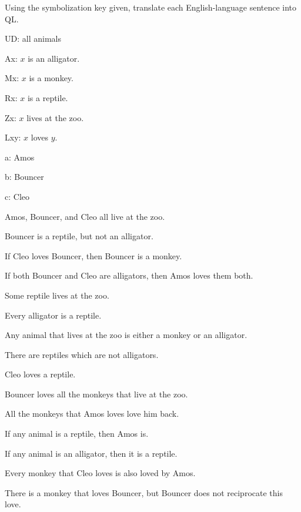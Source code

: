 \solutions
\problempart
\label{pr.QLalligators}
Using the symbolization key given, translate each English-language sentence into QL.
\begin{ekey}
\item[UD:] all animals
\item[Ax:] $x$ is an alligator.
\item[Mx:] $x$ is a monkey.
\item[Rx:] $x$ is a reptile.
\item[Zx:] $x$ lives at the zoo.
\item[Lxy:] $x$ loves $y$.
\item[a:] Amos
\item[b:] Bouncer
\item[c:] Cleo
\end{ekey}
\begin{earg}
\item Amos, Bouncer, and Cleo all live at the zoo. 
\item Bouncer is a reptile, but not an alligator. 
\item If Cleo loves Bouncer, then Bouncer is a monkey. 
\item If both Bouncer and Cleo are alligators, then Amos loves them both.
\item Some reptile lives at the zoo. 
\item Every alligator is a reptile. 
\item Any animal that lives at the zoo is either a monkey or an alligator. 
\item There are reptiles which are not alligators.
\item Cleo loves a reptile.
\item Bouncer loves all the monkeys that live at the zoo.
\item All the monkeys that Amos loves love him back.
\item If any animal is a reptile, then Amos is.
\item If any animal is an alligator, then it is a reptile.
\item Every monkey that Cleo loves is also loved by Amos.
\item There is a monkey that loves Bouncer, but Bouncer does not reciprocate this love.
\end{earg}



